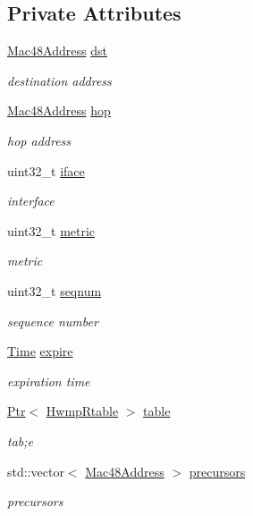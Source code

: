 \subsection*{Private Attributes}
\begin{DoxyCompactItemize}
\item 
\hyperlink{classns3_1_1Mac48Address}{Mac48\+Address} \hyperlink{classHwmpRtableTest_a1acc76986a88c36bbc037c166aa1b93e}{dst}
\begin{DoxyCompactList}\small\item\em destination address \end{DoxyCompactList}\item 
\hyperlink{classns3_1_1Mac48Address}{Mac48\+Address} \hyperlink{classHwmpRtableTest_ad88abf12d8a5c539bec9046b0b137900}{hop}
\begin{DoxyCompactList}\small\item\em hop address \end{DoxyCompactList}\item 
uint32\+\_\+t \hyperlink{classHwmpRtableTest_a2e1be779ea06d1ae0ac21d4462e5306b}{iface}
\begin{DoxyCompactList}\small\item\em interface \end{DoxyCompactList}\item 
uint32\+\_\+t \hyperlink{classHwmpRtableTest_aca3e3ee0bed4ac65834490ca9b1fbdf5}{metric}
\begin{DoxyCompactList}\small\item\em metric \end{DoxyCompactList}\item 
uint32\+\_\+t \hyperlink{classHwmpRtableTest_a9286f1003bbc201322c0f2ab9cc85097}{seqnum}
\begin{DoxyCompactList}\small\item\em sequence number \end{DoxyCompactList}\item 
\hyperlink{classns3_1_1Time}{Time} \hyperlink{classHwmpRtableTest_acfa35462586de4a38db8264663d00438}{expire}
\begin{DoxyCompactList}\small\item\em expiration time \end{DoxyCompactList}\item 
\hyperlink{classns3_1_1Ptr}{Ptr}$<$ \hyperlink{classns3_1_1dot11s_1_1HwmpRtable}{Hwmp\+Rtable} $>$ \hyperlink{classHwmpRtableTest_a2189a3cb5cad7f08c561dae58fee8a6a}{table}
\begin{DoxyCompactList}\small\item\em tab;e \end{DoxyCompactList}\item 
std\+::vector$<$ \hyperlink{classns3_1_1Mac48Address}{Mac48\+Address} $>$ \hyperlink{classHwmpRtableTest_a8ba7203ed0eb37c643b78cbf3a3aa8b5}{precursors}
\begin{DoxyCompactList}\small\item\em precursors \end{DoxyCompactList}\end{DoxyCompactItemize}
